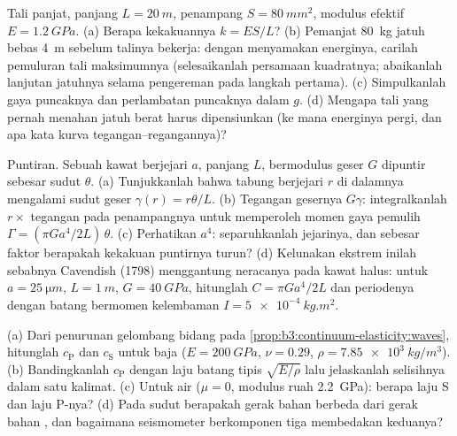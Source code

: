 \begin{exercise}[$\star\star$]\label{exo:b3:continuum-elasticity:7}
Tali panjat, panjang $L = \qty{20}{m}$, penampang $S =
\qty{80}{mm^2}$, modulus efektif $E = \qty{1.2}{GPa}$. (a) Berapa
kekakuannya $k = ES/L$? (b) Pemanjat \qty{80}{kg} jatuh bebas
\qty{4}{m} sebelum talinya bekerja: dengan menyamakan energinya,
carilah pemuluran tali maksimumnya (selesaikanlah persamaan kuadratnya;
abaikanlah lanjutan jatuhnya selama pengereman pada langkah pertama).
(c) Simpulkanlah gaya puncaknya dan perlambatan puncaknya dalam $g$. (d)
Mengapa tali yang pernah menahan jatuh berat harus dipensiunkan (ke mana
energinya pergi, dan apa kata kurva tegangan--regangannya)?
\end{exercise}

\begin{exercise}[$\star\star$]\label{exo:b3:continuum-elasticity:8}
Puntiran. Sebuah kawat berjejari $a$, panjang $L$, bermodulus geser $G$
dipuntir sebesar sudut $\theta$. (a) Tunjukkanlah bahwa tabung berjejari
$r$ di dalamnya mengalami sudut geser $\gamma(r) = r\theta/L$. (b)
Tegangan gesernya $G\gamma$: integralkanlah $r \times$ tegangan pada
penampangnya untuk memperoleh momen gaya pemulih $\Gamma = (\pi Ga^4/2L)\,\theta$.
(c) Perhatikan $a^4$: separuhkanlah jejarinya, dan sebesar faktor
berapakah kekakuan puntirnya turun? (d) Kelunakan ekstrem inilah
sebabnya Cavendish (1798) menggantung neracanya pada kawat halus: untuk
$a = \qty{25}{\micro m}$, $L =
\qty{1}{m}$, $G = \qty{40}{GPa}$, hitunglah $C = \pi Ga^4/2L$ dan
periodenya dengan batang bermomen kelembaman $I = \qty{5e-4}{kg.m^2}$.
\end{exercise}

\begin{exercise}[$\star\star$]\label{exo:b3:continuum-elasticity:9}
(a) Dari penurunan gelombang bidang pada
\cref{prop:b3:continuum-elasticity:waves}, hitunglah $c_{\text{P}}$ dan
$c_{\text{S}}$ untuk baja ($E = \qty{200}{GPa}$, $\nu = 0.29$, $\rho =
\qty{7.85e3}{kg/m^3}$). (b) Bandingkanlah $c_{\text{P}}$ dengan laju
batang tipis $\sqrt{E/\rho}$ lalu jelaskanlah selisihnya dalam satu
kalimat. (c) Untuk air ($\mu = 0$, modulus ruah \qty{2.2}{GPa}):
berapa laju S dan laju P-nya? (d) Pada sudut berapakah gerak bahan
 berbeda dari gerak bahan , dan bagaimana
seismometer berkomponen tiga membedakan keduanya?
\end{exercise}

